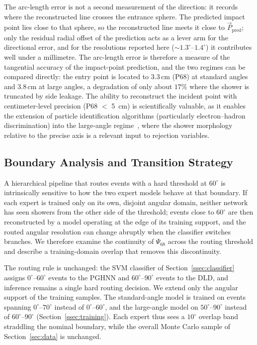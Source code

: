\documentclass[preprint,12pt]{elsarticle}
\begin{document}
The arc-length error is not a second measurement of the direction: it records where the reconstructed line crosses the entrance sphere. The predicted impact point lies close to that sphere, so the reconstructed line meets it close to $\vec{P}_{\text{pred}}$; only the residual radial offset of the prediction acts as a lever arm for the directional error, and for the resolutions reported here ($\sim1.3^{\circ}$--$1.4^{\circ}$) it contributes well under a millimetre. The arc-length error is therefore a measure of the tangential accuracy of the impact-point prediction, and the two regimes can be compared directly: the entry point is located to $3.3$\,cm (P68) at standard angles and $3.8$\,cm at large angles, a degradation of only about $17\%$ where the shower is truncated by side leakage. The ability to reconstruct the incident point with centimeter-level precision (P68 $<$ 5~cm) is scientifically valuable, as it enables the extension of particle identification algorithms (particularly electron--hadron discrimination) into the large-angle regime~\cite{ambrosi_2017}, where the shower morphology relative to the precise axis is a relevant input to rejection variables.

\subsection{Boundary Analysis and Transition Strategy}
\label{ssec:boundary}

A hierarchical pipeline that routes events with a hard threshold at
$60^{\circ}$ is intrinsically sensitive to how the two expert models behave
at that boundary. If each expert is trained only on its own, disjoint angular
domain, neither network has seen showers from the other side of the
threshold; events close to $60^{\circ}$ are then reconstructed by a model
operating at the edge of its training support, and the routed angular
resolution can change abruptly when the classifier switches branches. We
therefore examine the continuity of $\Psi_{68}$ across the routing threshold
and describe a training-domain overlap that removes this discontinuity.

The routing rule is unchanged: the SVM classifier of
Section~\ref{ssec:classifier} assigns $0^{\circ}$--$60^{\circ}$ events to the
PGHNN and $60^{\circ}$--$90^{\circ}$ events to the DLD, and inference remains
a single hard routing decision. We extend only the angular support of the
training samples. The standard-angle model is trained on events spanning
$0^{\circ}$--$70^{\circ}$ instead of $0^{\circ}$--$60^{\circ}$, and the
large-angle model on $50^{\circ}$--$90^{\circ}$ instead of
$60^{\circ}$--$90^{\circ}$ (Section~\ref{ssec:training}). Each expert thus
sees a $10^{\circ}$ overlap band straddling the nominal boundary, while the
overall Monte Carlo sample of Section~\ref{sec:data} is unchanged.
\end{document}
